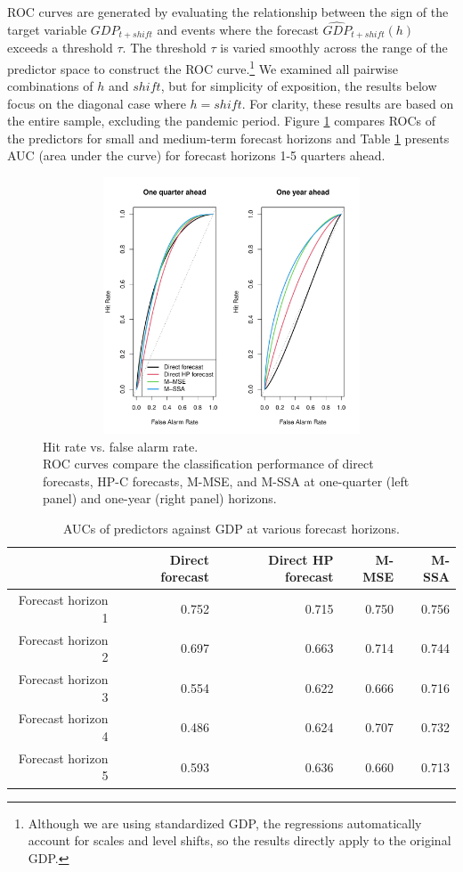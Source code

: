 \documentclass[11pt,a4paper]{article}
\begin{document}
ROC curves are generated by evaluating the relationship between the sign of the target variable $GDP_{t+shift}$ and events where the forecast $\widehat{GDP}_{t+shift}(h)$ exceeds a threshold $\tau$. The threshold $\tau$ is varied smoothly across the range of the predictor space to construct the ROC curve.\footnote{Although we are using standardized GDP, the regressions automatically account for scales and level shifts, so the results directly apply to the original GDP.} We examined all pairwise combinations of $h$ and $shift$, but for simplicity of exposition, the results below focus on the diagonal case where $h=shift$. 
For clarity, these results are based on the entire sample, excluding the pandemic period. Figure \ref{fig:ROC_GDP_shift_1_4} compares ROCs of the predictors for small and medium-term forecast horizons and Table \ref{tab:auc} presents AUC (area under the curve) for forecast horizons 1-5 quarters ahead.

\begin{figure}[h]
\begin{center}
\includegraphics[height=3in, width=5in]{./Figures/ROC_GDP_shift_1_4.pdf}
\caption{Hit rate vs. false alarm rate.\\ 
ROC curves compare the classification performance of direct forecasts, HP-C forecasts, M-MSE, and M-SSA at one-quarter (left panel) and one-year (right panel) horizons.
\label{fig:ROC_GDP_shift_1_4}}
\end{center}
\end{figure}


\begin{table}[ht]
\caption{AUCs of predictors against GDP at various forecast horizons.} 
\label{tab:auc}
\centering
\begin{tabular}{rrrrr}
  \hline
 & Direct forecast & Direct HP forecast & M-MSE & M-SSA \\ 
  \hline
Forecast horizon 1 & 0.752 & 0.715 & 0.750 & 0.756 \\ 
  Forecast horizon 2 & 0.697 & 0.663 & 0.714 & 0.744 \\ 
  Forecast horizon 3 & 0.554 & 0.622 & 0.666 & 0.716 \\ 
  Forecast horizon 4 & 0.486 & 0.624 & 0.707 & 0.732 \\ 
  Forecast horizon 5 & 0.593 & 0.636 & 0.660 & 0.713 \\ 
   \hline
\end{tabular}

\end{table}
\end{document}
